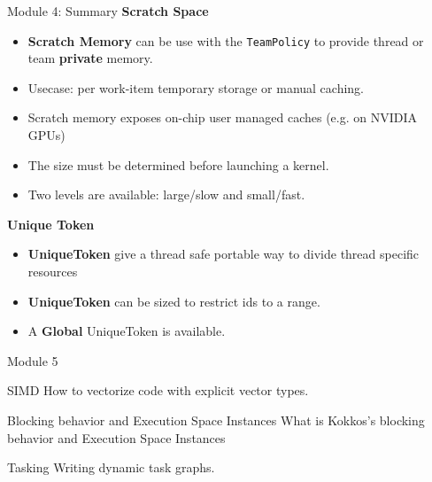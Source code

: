 \begin{frame}[fragile]{Module 4: Summary}
   \textbf{Scratch Space}
\begin{itemize}
    \item{\textbf{Scratch Memory} can be use with the \texttt{TeamPolicy} to provide thread or team \textbf{private} memory.}
    \item{Usecase: per work-item temporary storage or manual caching.}
    \item{Scratch memory exposes on-chip user managed caches (e.g. on NVIDIA GPUs)}
    \item{The size must be determined before launching a kernel.}
    \item{Two levels are available: large/slow and small/fast.}
  \end{itemize}
  \textbf{Unique Token}
  \begin{itemize}
    \item{\textbf{UniqueToken} give a thread safe portable way to divide thread specific resources}
    \item{\textbf{UniqueToken} can be sized to restrict ids to a range.}
    \item{A \textbf{Global} UniqueToken is available.}
  \end{itemize}

\end{frame}

\begin{frame}{Module 5}
  \begin{block}{SIMD}
    How to vectorize code with explicit vector types.
  \end{block}

  \begin{block}{Blocking behavior and Execution Space Instances}
    What is Kokkos's blocking behavior and Execution Space Instances
  \end{block}

  \begin{block}{Tasking}
    Writing dynamic task graphs.
  \end{block}
\end{frame}





